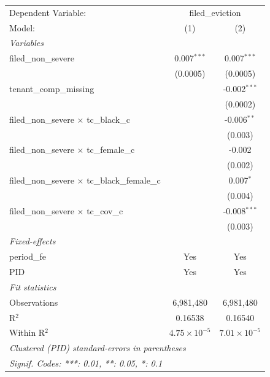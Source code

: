 \par\endgroup
\begingroup
\centering
\begin{tabular}{lcc}
   \tabularnewline \midrule \midrule
   Dependent Variable: & \multicolumn{2}{c}{filed\_eviction}\\
   Model:                                                 & (1)                   & (2)\\  
   \midrule
   \emph{Variables}\\
   filed\_non\_severe                                     & 0.007$^{***}$         & 0.007$^{***}$\\   
                                                          & (0.0005)              & (0.0005)\\   
   tenant\_comp\_missing                                  &                       & -0.002$^{***}$\\   
                                                          &                       & (0.0002)\\   
   filed\_non\_severe $\times$ tc\_black\_c               &                       & -0.006$^{**}$\\   
                                                          &                       & (0.003)\\   
   filed\_non\_severe $\times$ tc\_female\_c              &                       & -0.002\\   
                                                          &                       & (0.002)\\   
   filed\_non\_severe $\times$ tc\_black\_female\_c       &                       & 0.007$^{*}$\\   
                                                          &                       & (0.004)\\   
   filed\_non\_severe $\times$ tc\_cov\_c                 &                       & -0.008$^{***}$\\   
                                                          &                       & (0.003)\\   
   \midrule
   \emph{Fixed-effects}\\
   period\_fe                                             & Yes                   & Yes\\  
   PID                                                    & Yes                   & Yes\\  
   \midrule
   \emph{Fit statistics}\\
   Observations                                           & 6,981,480             & 6,981,480\\  
   R$^2$                                                  & 0.16538               & 0.16540\\  
   Within R$^2$                                           & $4.75\times 10^{-5}$  & $7.01\times 10^{-5}$\\   
   \midrule \midrule
   \multicolumn{3}{l}{\emph{Clustered (PID) standard-errors in parentheses}}\\
   \multicolumn{3}{l}{\emph{Signif. Codes: ***: 0.01, **: 0.05, *: 0.1}}\\
\end{tabular}
\par\endgroup
